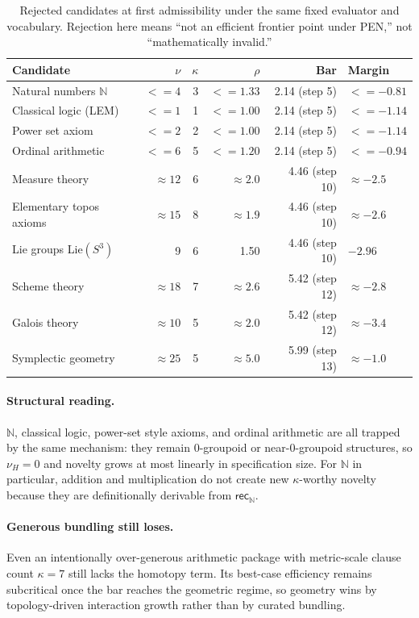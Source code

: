 \documentclass[11pt,a4paper]{article}
\def\leq{<=}%
\theoremstyle{plain}
\theoremstyle{definition}
\theoremstyle{remark}
\newcommand{\N}{\mathbb{N}}
\begin{document}
\begin{table}[tbp]
\centering
\caption{Rejected candidates at first admissibility under the same fixed evaluator and vocabulary. Rejection here means ``not an efficient frontier point under PEN,'' not ``mathematically invalid.''}
\label{tab:rejected}
\small
\begin{tabular}{@{}l rrrrl@{}}
\toprule
Candidate & $\nu$ & $\kappa$ & $\rho$ & Bar & Margin \\
\midrule
Natural numbers $\N$ & $\leq 4$ & 3 & $\leq 1.33$ & 2.14 (step 5) & $\leq -0.81$ \\
Classical logic (LEM) & $\leq 1$ & 1 & $\leq 1.00$ & 2.14 (step 5) & $\leq -1.14$ \\
Power set axiom & $\leq 2$ & 2 & $\leq 1.00$ & 2.14 (step 5) & $\leq -1.14$ \\
Ordinal arithmetic & $\leq 6$ & 5 & $\leq 1.20$ & 2.14 (step 5) & $\leq -0.94$ \\
Measure theory & $\approx 12$ & 6 & $\approx 2.0$ & 4.46 (step 10) & $\approx -2.5$ \\
Elementary topos axioms & $\approx 15$ & 8 & $\approx 1.9$ & 4.46 (step 10) & $\approx -2.6$ \\
Lie groups Lie$(S^3)$ & 9 & 6 & 1.50 & 4.46 (step 10) & $-2.96$ \\
Scheme theory & $\approx 18$ & 7 & $\approx 2.6$ & 5.42 (step 12) & $\approx -2.8$ \\
Galois theory & $\approx 10$ & 5 & $\approx 2.0$ & 5.42 (step 12) & $\approx -3.4$ \\
Symplectic geometry & $\approx 25$ & 5 & $\approx 5.0$ & 5.99 (step 13) & $\approx -1.0$ \\
\bottomrule
\end{tabular}
\end{table}

\paragraph{Structural reading.}
$\N$, classical logic, power-set style axioms, and ordinal arithmetic are all trapped by the same mechanism: they remain 0-groupoid or near-0-groupoid structures, so $\nu_H=0$ and novelty grows at most linearly in specification size. For $\N$ in particular, addition and multiplication do not create new $\kappa$-worthy novelty because they are definitionally derivable from $\mathsf{rec}_\N$.

\paragraph{Generous bundling still loses.}
Even an intentionally over-generous arithmetic package with metric-scale clause count $\kappa=7$ still lacks the homotopy term. Its best-case efficiency remains subcritical once the bar reaches the geometric regime, so geometry wins by topology-driven interaction growth rather than by curated bundling.
\end{document}
